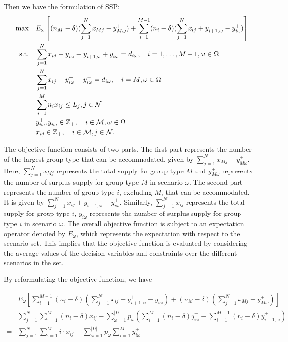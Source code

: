 Then we have the formulation of SSP:
    \begin{align}
    \quad \max \quad & E_{\omega}\left[(n_{M}-\delta) (\sum_{j= 1}^{N} x_{Mj} - y_{M \omega}^{+}) + \sum_{i=1}^{M-1} (n_i-\delta) (\sum_{j= 1}^{N} x_{ij} + y_{i+1,\omega}^{+} - y_{i \omega}^{+})\right] \\
    \text {s.t.} \quad & \sum_{j= 1}^{N} x_{ij}-y_{i \omega}^{+}+
    y_{i+1, \omega}^{+} + y_{i \omega}^{-}=d_{i \omega}, \quad i = 1,\ldots, M-1, \omega \in \Omega \label{DEF_constr1} \\
    & \sum_{j= 1}^{N} x_{ij} -y_{i \omega}^{+}+y_{i \omega}^{-}=d_{i \omega}, \quad i = M, \omega \in \Omega \label{DEF_constr2}\\
    & \sum_{i=1}^{M} n_{i} x_{ij} \leq L_j, j \in \mathcal{N}  \label{DEF_constr3} \\
    & y_{i \omega}^{+}, y_{i \omega}^{-} \in \mathbb{Z}_{+}, \quad i \in \mathcal{M}, \omega \in \Omega \notag \\
    & x_{ij} \in \mathbb{Z}_{+}, \quad i \in \mathcal{M}, j \in \mathcal{N} \notag.
    \end{align}

The objective function consists of two parts. The first part represents the number of the largest group type that can be accommodated, given by $\sum_{j=1}^{N} x_{Mj} - y_{M\omega}^{+}$. Here, $\sum_{j=1}^{N} x_{Mj}$ represents the total supply for group type $M$ and $y_{M\omega}^{+}$ represents the number of surplus supply for group type $M$ in scenario $\omega$. The second part represents the number of group type $i$, excluding $M$, that can be accommodated. It is given by $\sum_{j=1}^{N} x_{ij} + y_{i+1,\omega}^{+} - y_{i\omega}^{+}$. Similarly, $\sum_{j=1}^{N} x_{ij}$ represents the total supply for group type $i$, $y_{i\omega}^{+}$ represents the number of surplus supply for group type $i$ in scenario $\omega$. The overall objective function is subject to an expectation operator denoted by $E_{\omega}$, which represents the expectation with respect to the scenario set. This implies that the objective function is evaluated by considering the average values of the decision variables and constraints over the different scenarios in the set.


By reformulating the objective function, we have

\begin{align*}
  & E_{\omega}\left[\sum_{i=1}^{M-1} (n_i-\delta) (\sum_{j= 1}^{N} x_{ij} + y_{i+1,\omega}^{+} - y_{i \omega}^{+}) + (n_M-\delta) (\sum_{j= 1}^{N} x_{Mj} - y_{M \omega}^{+})\right] \\
  =& \sum_{j =1}^{N} \sum_{i=1}^M (n_i- \delta) x_{ij} - \sum_{\omega =1}^{|\Omega|} p_{\omega} \left(\sum_{i=1}^{M}(n_i- \delta)y_{i \omega}^{+} - \sum_{i=1}^{M-1}(n_i-\delta)y_{i+1, \omega}^{+}\right) \\
  =& \sum_{j =1}^{N} \sum_{i=1}^M i \cdot x_{ij} - \sum_{\omega =1}^{|\Omega|} p_{\omega} \sum_{i = 1}^{M} y_{i \omega}^{+}
\end{align*}

